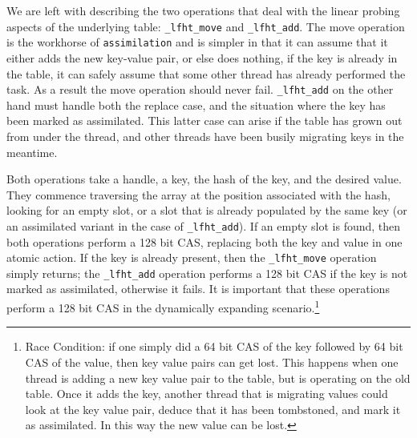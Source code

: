 We are left with describing the two operations that deal with the linear probing aspects
of the underlying table:  \texttt{\_lfht\_move} and \texttt{\_lfht\_add}. The move operation
is the workhorse of \texttt{assimilation} and is simpler in that it can assume that it either
adds the new key-value pair, or else does nothing, if the key is already in the table, it
can safely assume that some other thread has already performed the task. As a result
the move operation should never fail. \texttt{\_lfht\_add} on the other hand must
handle both the replace case, and the situation where the key has been marked as assimilated.
This latter case can arise if the table has grown out from under the thread, and other threads
have been busily migrating keys in the meantime.

Both operations take a handle, a key, the hash of the key, and the
desired value. They commence traversing the array at the position
associated with the hash, looking for an empty slot, or a slot that is
already populated by the same key (or an assimilated variant in the
case of \texttt{\_lfht\_add}). If an empty slot is found, then both operations
perform a 128 bit CAS, replacing both the key and value in one atomic action.
If the key is already present, then the \texttt{\_lfht\_move} operation simply
returns; the \texttt{\_lfht\_add} operation performs a 128 bit CAS if the key
is not marked as assimilated, otherwise it fails. It is important that these operations
perform a 128 bit CAS in the dynamically expanding scenario.\footnote{Race Condition: if one simply
  did a 64 bit CAS of the key followed by 64 bit CAS of the value, then key value pairs can get lost.
  This happens when one thread is adding a new key value pair to the table, but is operating on the
  old table. Once it adds the key, another thread that is migrating values could look at the
  key value pair, deduce that it has been tombstoned, and mark it as assimilated. In this way
  the new value can be lost.}



